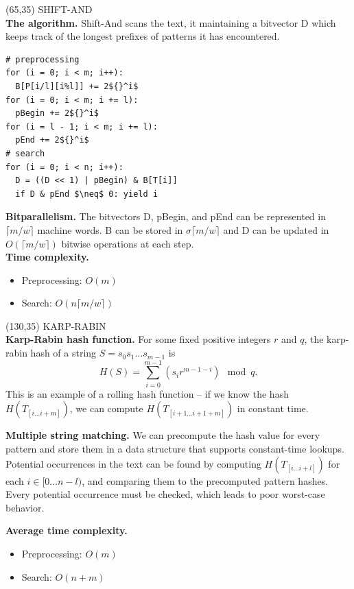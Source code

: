 \documentclass[a4paper]{article} %
\newcommand{\ceil}[1]{\lceil #1 \rceil}
\begin{document}
  \begin{textblock}{60}(65,35)
    {\sffamily\normalsize{\color{sciorange}SHIFT-AND}}\vspace{1mm}\\
    \footnotesize 
      \textbf{The algorithm.} Shift-And scans the text, it maintaining a bitvector D which keeps track of the longest prefixes of patterns it has encountered. 
\begin{lstlisting}[mathescape]
# preprocessing      
for (i = 0; i < m; i++):
  B[P[i/l][i%l]] += 2${}^i$
for (i = 0; i < m; i += l): 
  pBegin += 2${}^i$
for (i = l - 1; i < m; i += l): 
  pEnd += 2${}^i$
# search      
for (i = 0; i < n; i++):
  D = ((D << 1) | pBegin) & B[T[i]]
  if D & pEnd $\neq$ 0: yield i
\end{lstlisting}
      \textbf{Bitparallelism.} The bitvectors D, pBegin, and pEnd can be represented in $\ceil {m/w}$ machine words. B can be stored in $\sigma\ceil {m/w}$ and D can be updated in $O(\ceil {m/w})$ bitwise operations at each step. \vspace{1mm}\\
      \textbf{Time complexity.}
      \begin{itemize}[labelindent=2mm,leftmargin=*,itemsep=1mm, topsep=1mm]
        \item Preprocessing: $O(m)$
        \item Search: $O(n \lceil m / w \rceil)$
      \end{itemize}
  \end{textblock}

  \begin{textblock}{60}(130,35)
    {\sffamily\normalsize{\color{sciorange}KARP-RABIN}}\vspace{1mm}\\
    \footnotesize 
      \textbf{Karp-Rabin hash function.} For some fixed positive integers $r$ and $q$, the karp-rabin hash of a string 
      $S = s_0 s_1 \dotsc s_{m-1}$ is 
      $$ H(S) = \sum_{i=0}^{m-1} (s_i r^{m-1-i})\mod q. $$
      This is an example of a rolling hash function -- if we know the hash $H(T_{[i\dotsc i+m]})$, 
      we can compute $H(T_{[i+1\dotsc i+1+m]})$ in constant time.\vspace{1mm}
      
      \textbf{Multiple string matching.} We can precompute the hash value for every pattern and store them in a data structure that supports constant-time lookups. Potential occurrences in the text can be found by computing $H(T_{[i\dotsc i+l]})$ for each $i \in [0\dotsc n-l)$, and comparing them to the precomputed pattern hashes. Every potential occurrence must be checked, which leads to poor worst-case behavior.
      \vspace{1mm}
      
      \textbf{Average time complexity.}
      \begin{itemize}[labelindent=2mm,leftmargin=*,itemsep=1mm, topsep=1mm]
        \item Preprocessing: $O(m)$
        \item Search: $O(n+m)$
      \end{itemize}
  \end{textblock}
\end{document}
